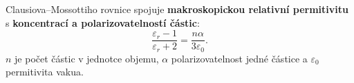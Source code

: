 Clausiova--Mossottiho rovnice spojuje \textbf{makroskopickou relativní permitivitu} s \textbf{koncentrací a polarizovatelností částic}:
\[\boxed{\frac{\varepsilon_r-1}{\varepsilon_r+2}=\frac{n\alpha}{3\varepsilon_0}}.\]
$n$ je počet částic v jednotce objemu, $\alpha$ polarizovatelnost jedné částice a $\varepsilon_0$ permitivita vakua.
